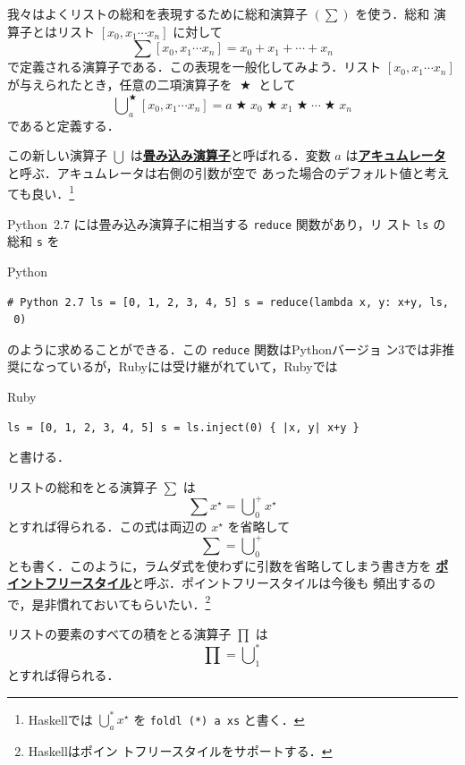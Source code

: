 \documentclass[a5paper,twoside,fleqn]{jsbook}
\newcommand{\programminglanguage}[1]{\textsf{#1}}
\newcommand{\haskell}{\programminglanguage{Haskell}}
\newcommand{\python}{\programminglanguage{Python}}
\newcommand{\ruby}{\programminglanguage{Ruby}}
\newcommand{\keyword}[1]{{\underline{\textbf{#1}}}}
\newcommand{\code}[1]{\texttt{#1}}
\newenvironment{pythoncode}{\begin{itembox}[r]{\python}}{\end{itembox}}
\newenvironment{rubycode}{\begin{itembox}[r]{\ruby}}{\end{itembox}}
\DeclareMathOperator{\mBinOp}{\bigstar}
\DeclareMathOperator*{\mFold}{\bigcup}
\newcommand{\mListWith}[1]{\left[#1\right]}
\newcommand{\mList}[1]{{#1}^\mathrm{\star}}
\begin{document}
我々はよくリストの総和を表現するために総和演算子 $(\sum)$ を使う．総和
演算子とはリスト $\mListWith{x_0,x_1\dotsb x_n}$ に対して
\begin{equation}
\sum\mListWith{x_0,x_1\dotsb x_n}=x_0+x_1+\dotsb+x_n
\end{equation}
で定義される演算子である．この表現を一般化してみよう．リスト
$\mListWith{x_0,x_1\dotsb x_n}$ が与えられたとき，任意の二項演算子を
$\mBinOp$ として
\begin{equation}
\mFold^{\mBinOp}_a\mListWith{x_0,x_1\dotsb x_n} =a\mBinOp x_0\mBinOp
x_1\mBinOp\dotsb\mBinOp x_n
\end{equation}
であると定義する．

この新しい演算子 $\mFold$ は\keyword{畳み込み演算子}と呼ばれる．変数
$a$ は\keyword{アキュムレータ}と呼ぶ．アキュムレータは右側の引数が空で
あった場合のデフォルト値と考えても良い．\footnote{\haskell では
  $\mFold^*_a\mList{x}$ を \code{foldl (*) a xs} と書く．}

\python\ 2.7 には畳み込み演算子に相当する \code{reduce} 関数があり，リ
スト \code{ls} の総和 \code{s} を
\begin{pythoncode}
\begin{verbatim}
# Python 2.7 ls = [0, 1, 2, 3, 4, 5] s = reduce(lambda x, y: x+y, ls,
 0)
\end{verbatim}
\end{pythoncode}
のように求めることができる．この \code{reduce} 関数は\python バージョ
ン3では非推奨になっているが，\ruby には受け継がれていて，\ruby では
\begin{rubycode}
\begin{verbatim}
ls = [0, 1, 2, 3, 4, 5] s = ls.inject(0) { |x, y| x+y }
\end{verbatim}
\end{rubycode}
と書ける．

リストの総和をとる演算子 $\sum$ は
\begin{equation}
\sum\mList{x}=\mFold^+_0\mList{x}
\end{equation}
とすれば得られる．この式は両辺の $\mList{x}$ を省略して
\begin{equation}
\sum=\mFold^+_0
\end{equation}
とも書く．このように，ラムダ式を使わずに引数を省略してしまう書き方を
\keyword{ポイントフリースタイル}と呼ぶ．ポイントフリースタイルは今後も
頻出するので，是非慣れておいてもらいたい．\footnote{\haskell はポイン
  トフリースタイルをサポートする．}

リストの要素のすべての積をとる演算子 $\prod$ は
\begin{equation}
\prod=\mFold^*_1
\end{equation}
とすれば得られる．
\end{document}
